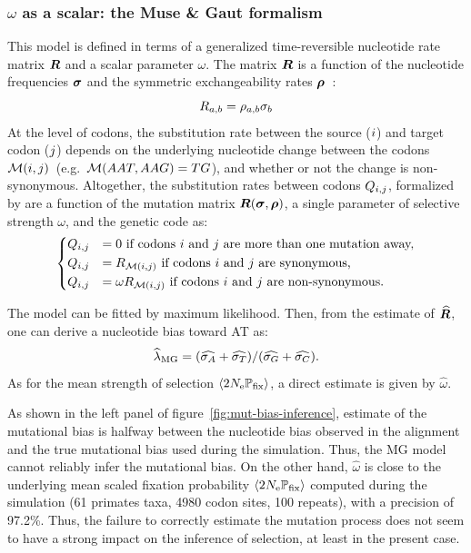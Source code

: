 \documentclass{article}
\begin{document}
\subsubsection{\texorpdfstring{$\omega$}{ω} as a scalar: the Muse \& Gaut formalism}
This model is defined in terms of a generalized time-reversible nucleotide rate matrix $\bm{R}$ and a scalar parameter $\omega$.
The matrix $\bm{R}$ is a function of the nucleotide frequencies $\bm{\sigma}$ and the symmetric exchangeability rates $\bm{\rho}$~\citep{Tavare1986}:
\begin{equation}
 R_{a, b} = \rho_{a,b}\sigma_b
\end{equation}
At the level of codons, the {substitution} rate between the source (${i}$) and target codon (${j}$) depends on the underlying nucleotide change between the codons $\mathcal{M}({i}, {j})$~(e.g.~$\mathcal{M}(AAT, AAG) = TG$), and whether or not the change is {non-synonymous}.
Altogether, the {substitution} rates between codons $Q_{{i}, {j}}$, formalized by \citet{Muse1994} are a function of the mutation matrix $\bm{R}(\bm{\sigma}, \bm{\rho})$, a single parameter of selective strength $\omega$, and the genetic code as:
\begin{equation}
 \begin{dcases}
 Q_{{i}, {j}} & = 0 \text{ if codons ${i}$ and ${j}$ are more than one mutation away,} \\
 Q_{{i}, {j}} & = R_{\mathcal{M}({i}, {j})} \text{ if codons ${i}$ and ${j}$ are {synonymous},} \\
 Q_{{i}, {j}} & = \omega R_{\mathcal{M}({i}, {j})} \text{ if codons ${i}$ and ${j}$ are non-synonymous}.
 \end{dcases}
 \label{eq:codon-muse-gaut}
\end{equation}

The model can be fitted by maximum {likelihood}.
Then, from the estimate of $\widehat{\bm{R}}$, one can derive a nucleotide bias toward AT as:
\begin{equation}
 \widehat{\lambda}_{\text{{MG}}} = (\widehat{\sigma_A} +\widehat{\sigma_T}) /(\widehat{\sigma_G} +\widehat{\sigma_C}).\label{eq:lambda-R}
\end{equation}
As for the mean strength of selection $\left\langle 2 N_{\text{e}} \mathbb{P}_{\text{fix}} \right\rangle$, a direct estimate is given by $\widehat{\omega}$.

As shown in the left panel of figure~\ref{fig:mut-bias-inference}, estimate of the mutational bias is halfway between the nucleotide bias observed in the alignment and the true mutational bias used during the simulation.
Thus, the {MG} model cannot reliably infer the mutational bias.
On the other hand, $\widehat{\omega}$ is close to the underlying mean scaled fixation probability $\left\langle 2 N_{\text{e}} \mathbb{P}_{\text{fix}} \right\rangle$ computed during the simulation (61 primates taxa, 4980 codon sites, 100 repeats), with a precision of 97.2\%.
Thus, the failure to correctly estimate the mutation process does not seem to have a strong impact on the inference of selection, at least in the present case.
\end{document}
